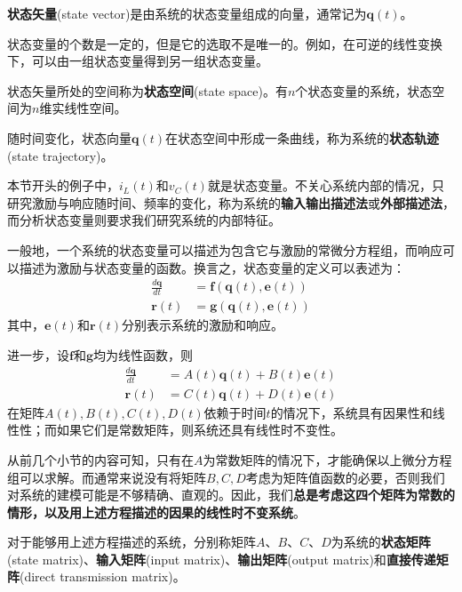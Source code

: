 \begin{definition}[状态矢量]
    \textbf{状态矢量}(state vector)是由系统的状态变量组成的向量，通常记为$\mathbf{q}(t)$。
\end{definition}

状态变量的个数是一定的，但是它的选取不是唯一的。例如，在可逆的线性变换下，可以由一组状态变量得到另一组状态变量。
    
\begin{definition}[状态空间和状态轨迹]
    状态矢量所处的空间称为\textbf{状态空间}(state space)。有$n$个状态变量的系统，状态空间为$n$维实线性空间。
    
    随时间变化，状态向量$\mathbf{q}(t)$在状态空间中形成一条曲线，称为系统的\textbf{状态轨迹}(state trajectory)。
\end{definition}

本节开头的例子中，$i_L(t)$和$v_C(t)$就是状态变量。不关心系统内部的情况，只研究激励与响应随时间、频率的变化，称为系统的\textbf{输入输出描述法}或\textbf{外部描述法}，而分析状态变量则要求我们研究系统的内部特征。

一般地，一个系统的状态变量可以描述为包含它与激励的常微分方程组，而响应可以描述为激励与状态变量的函数。换言之，状态变量的定义可以表述为：\begin{align*}
    \frac{d\mathbf{q}}{dt}&=\mathbf{f}(\mathbf{q}(t),\mathbf{e}(t))\\
    \mathbf{r}(t)&=\mathbf{g}(\mathbf{q}(t),\mathbf{e}(t))
\end{align*}
其中，$\mathbf{e}(t)$和$\mathbf{r}(t)$分别表示系统的激励和响应。

进一步，设$\mathbf{f}$和$\mathbf{g}$均为线性函数，则\begin{align*}
    \frac{d\mathbf{q}}{dt}&=A(t)\mathbf{q}(t)+B(t)\mathbf{e}(t)\\
    \mathbf{r}(t)&=C(t)\mathbf{q}(t)+D(t)\mathbf{e}(t)
\end{align*}
在矩阵$A(t),B(t),C(t),D(t)$依赖于时间$t$的情况下，系统具有因果性和线性性；而如果它们是常数矩阵，则系统还具有线性时不变性。

从前几个小节的内容可知，只有在$A$为常数矩阵的情况下，才能确保以上微分方程组可以求解。而通常来说没有将矩阵$B,C,D$考虑为矩阵值函数的必要，否则我们对系统的建模可能是不够精确、直观的。因此，我们\textbf{总是考虑这四个矩阵为常数的情形，以及用上述方程描述的因果的线性时不变系统}。

\begin{definition}
    对于能够用上述方程描述的系统，分别称矩阵$A$、$B$、$C$、$D$为系统的\textbf{状态矩阵}(state matrix)、\textbf{输入矩阵}(input matrix)、\textbf{输出矩阵}(output matrix)和\textbf{直接传递矩阵}(direct transmission matrix)。
\end{definition}

